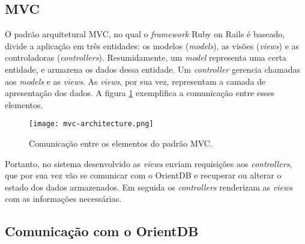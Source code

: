 \subsection{MVC} \label{mvc-subsection}

	O padrão arquitetural MVC, no qual o \textit{framework} Ruby on Rails é baseado, divide a aplicação em três entidades: os modelos (\textit{models}), as visões (\textit{views}) e as controladoras (\textit{controllers}). Resumidamente, um \textit{model} representa uma certa entidade, e armazena os dados dessa entidade. Um \textit{controller} gerencia chamadas aos \textit{models} e as \textit{views}. As \textit{views}, por sua vez, representam a camada de apresentação dos dados. A figura \ref{fig:mvc} exemplifica a comunicação entre esses elementos.
	
\begin{figure}[H]
\centering
\texttt{[image: mvc-architecture.png]}
\caption{Comunicação entre os elementos do padrão MVC.}
\label{fig:mvc}
\end{figure}

Portanto, no sistema desenvolvido as \textit{views} enviam requisições aos \textit{controllers}, que por sua vez vão se comunicar com o OrientDB e recuperar ou alterar o estado dos dados armazenados. Em seguida os \textit{controllers} renderizam as \textit{views} com as informações necessárias.

\subsection{Comunicação com o OrientDB} \label{orient-communication}

